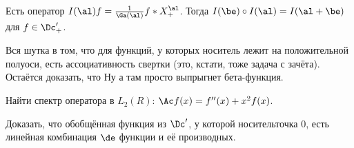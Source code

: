 \documentclass[a4paper]{article}
\begin{document}
\begin{problem}
Есть оператор $I(\al) f= \frac{1}{\Ga(\al)} f*X_+^\al$. Тогда $I(\be)\circ I(\al) = I(\al+\be)$ для $f\in \Dc'_+$.
\end{problem}
\begin{hint}
Вся шутка в том, что для функций, у которых носитель лежит на положительной полуоси, есть ассоциативность
свертки (это, кстати, тоже задача с зачёта). Остаётся доказать, что
 Ну а там просто выпрыгнет бета-функция.
\end{hint}

\begin{problem}
Найти спектр оператора в $L_2(R)$: $\Ac f(x) = f''(x)+x^2 f(x)$.
\end{problem}

\begin{problem}
Доказать, что обобщённая функция из $\Dc'$, у которой носитель\т точка $0$, есть линейная комбинация $\de$\д
функции и её производных.
\end{problem}

\medskip
\dmvntrail
\end{document}
